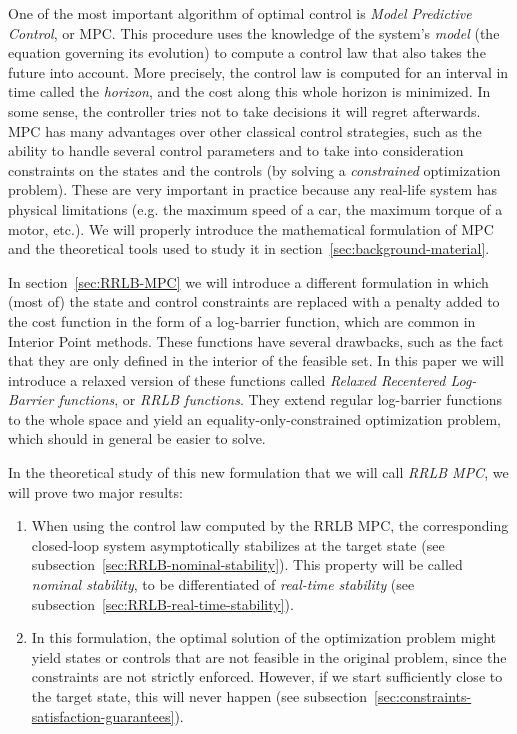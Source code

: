 \documentclass[12pt]{article}
\begin{document}
One of the most important algorithm of optimal control is \textit{Model Predictive Control}, or MPC.
This procedure uses the knowledge of the system's \textit{model} (the equation governing its evolution) to compute a control law that also takes the future into account.
More precisely, the control law is computed for an interval in time called the \textit{horizon}, and the cost along this whole horizon is minimized.
In some sense, the controller tries not to take decisions it will regret afterwards.
MPC has many advantages over other classical control strategies, such as the ability to handle several control parameters and to take into consideration constraints on the states and the controls (by solving a \textit{constrained} optimization problem).
These are very important in practice because any real-life system has physical limitations (e.g. the maximum speed of a car, the maximum torque of a motor, etc.).
We will properly introduce the mathematical formulation of MPC and the theoretical tools used to study it in section~\ref{sec:background-material}.

In section~\ref{sec:RRLB-MPC} we will introduce a different formulation in which (most of) the state and control constraints are replaced with a penalty added to the cost function in the form of a log-barrier function, which are common in Interior Point methods.
These functions have several drawbacks, such as the fact that they are only defined in the interior of the feasible set.
In this paper we will introduce a relaxed version of these functions called \textit{Relaxed Recentered Log-Barrier functions}, or \textit{RRLB functions}.
They extend regular log-barrier functions to the whole space and yield an equality-only-constrained optimization problem, which should in general be easier to solve.

In the theoretical study of this new formulation that we will call \textit{RRLB MPC}, we will prove two major results:

\begin{enumerate}
	\item When using the control law computed by the RRLB MPC, the corresponding closed-loop system asymptotically stabilizes at the target state (see subsection~\ref{sec:RRLB-nominal-stability}).
	This property will be called \textit{nominal stability}, to be differentiated of \textit{real-time stability} (see subsection~\ref{sec:RRLB-real-time-stability}).
	\item In this formulation, the optimal solution of the optimization problem might yield states or controls that are not feasible in the original problem, since the constraints are not strictly enforced.
	However, if we start sufficiently close to the target state, this will never happen (see subsection~\ref{sec:constraints-satisfaction-guarantees}).
\end{enumerate}
\end{document}
